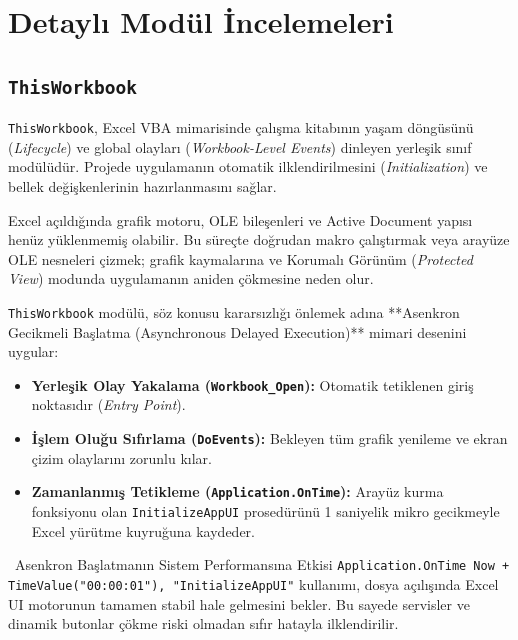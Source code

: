 \chapter{Detaylı Modül İncelemeleri}


\section{\texttt{ThisWorkbook}}

\texttt{ThisWorkbook}, Excel VBA mimarisinde çalışma kitabının yaşam döngüsünü (\textit{Lifecycle}) ve global olayları (\textit{Workbook-Level Events}) dinleyen yerleşik sınıf modülüdür. Projede uygulamanın otomatik ilklendirilmesini (\textit{Initialization}) ve bellek değişkenlerinin hazırlanmasını sağlar.

Excel açıldığında grafik motoru, OLE bileşenleri ve Active Document yapısı henüz yüklenmemiş olabilir. Bu süreçte doğrudan makro çalıştırmak veya arayüze OLE nesneleri çizmek; grafik kaymalarına ve Korumalı Görünüm (\textit{Protected View}) modunda uygulamanın aniden çökmesine neden olur.

\texttt{ThisWorkbook} modülü, söz konusu kararsızlığı önlemek adına **Asenkron Gecikmeli Başlatma (Asynchronous Delayed Execution)** mimari desenini uygular:

\begin{itemize}\setlength{\itemsep}{0pt}\setlength{\parskip}{1pt}
    \item \textbf{Yerleşik Olay Yakalama (\texttt{Workbook\_Open}):} Otomatik tetiklenen giriş noktasıdır (\textit{Entry Point}).
    \item \textbf{İşlem Oluğu Sıfırlama (\texttt{DoEvents}):} Bekleyen tüm grafik yenileme ve ekran çizim olaylarını zorunlu kılar.
    \item \textbf{Zamanlanmış Tetikleme (\texttt{Application.OnTime}):} Arayüz kurma fonksiyonu olan \texttt{InitializeAppUI} prosedürünü 1 saniyelik mikro gecikmeyle Excel yürütme kuyruğuna kaydeder.
\end{itemize}

\vspace{0.15cm}

\begin{infobox}{\faClock\ Asenkron Başlatmanın Sistem Performansına Etkisi}
\texttt{Application.OnTime Now + TimeValue("00:00:01"), "InitializeAppUI"} kullanımı, dosya açılışında Excel UI motorunun tamamen stabil hale gelmesini bekler. Bu sayede servisler ve dinamik butonlar çökme riski olmadan sıfır hatayla ilklendirilir.
\end{infobox}

